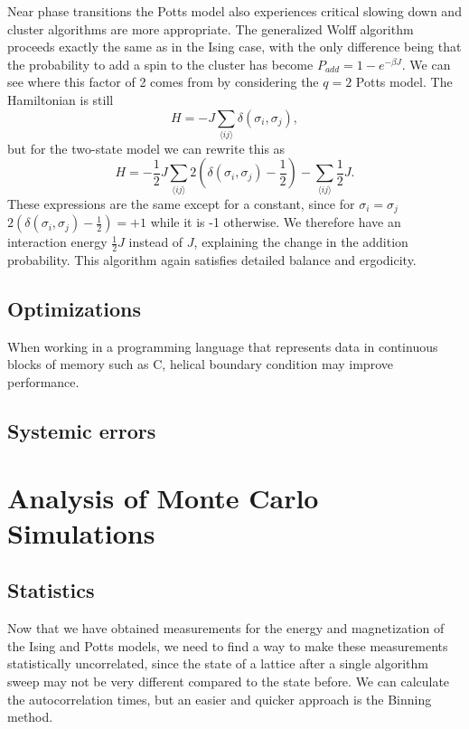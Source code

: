 \documentclass[11pt, a4paper]{report} %
\begin{document}
Near phase transitions the Potts model also experiences critical slowing down and cluster algorithms are more appropriate.
The generalized Wolff algorithm proceeds exactly the same as in the Ising case, with the only difference being that the probability to add a spin to the cluster has become \(P_{add} = 1 - e^{-\beta J}\).
We can see where this factor of 2 comes from by considering the \(q=2\) Potts model.
The Hamiltonian is still
\begin{equation}
	H = -J\sum_{\langle i j \rangle} \delta(\sigma_i, \sigma_j),
\end{equation}
but for the two-state model we can rewrite this as
\begin{equation}
	H = -\frac{1}{2} J \sum_{\langle i j \rangle} 2 (\delta(\sigma_i, \sigma_j) - \frac{1}{2}) - \sum_{\langle i j \rangle} \frac{1}{2}J.
\end{equation}
These expressions are the same except for a constant, since for \(\sigma_i = \sigma_j\) \(2 (\delta(\sigma_i, \sigma_j) - \frac{1}{2}) = +1\) while it is -1 otherwise.
We therefore have an interaction energy \(\frac{1}{2}J\) instead of \(J\), explaining the change in the addition probability.
This algorithm again satisfies detailed balance and ergodicity.\cite{newman:1999}



\section{Optimizations}
When working in a programming language that represents data in continuous blocks of memory such as C, helical boundary condition may improve performance.

\section{Systemic errors}


\chapter{Analysis of Monte Carlo Simulations}
\section{Statistics}
Now that we have obtained measurements for the energy and magnetization of the Ising and Potts models, we need to find a way to make these measurements statistically uncorrelated, since the state of a lattice after a single algorithm sweep may not be very different compared to the state before.
We can calculate the autocorrelation times, but an easier and quicker approach is the Binning method.
\end{document}
